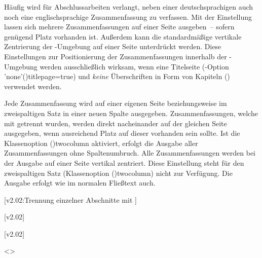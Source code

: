 \begin{DeclareEntity*}{}
\begin{DeclareEntity*}{}
\begin{DeclareEntity*}{}
\begin{Declaration}
Häufig wird für Abschlussarbeiten verlangt, neben einer deutschsprachigen auch 
noch eine englischsprachige Zusammenfassung zu verfassen. Mit der Einstellung 
 lassen sich mehrere Zusammenfassungen auf einer 
Seite ausgeben~-- sofern genügend Platz vorhanden ist. Außerdem kann 
die standardmäßige vertikale Zentrierung der -Umgebung 
auf einer Seite unterdrückt werden. Diese Einstellungen zur Positionierung der 
Zusammenfassungen innerhalb der -Umgebung werden 
ausschließlich wirksam, wenn eine Titelseite 
(\KOMAScript-Option \Option'none'(){titlepage=true}) und 
\emph{keine} Überschriften in Form von Kapiteln () 
verwendet werden.
%
\begin{DeclareValues}{}
  Jede Zusammenfassung wird auf einer eigenen Seite
  beziehungsweise im zweispaltigen Satz in einer neuen Spalte ausgegeben.
  Zusammenfassungen, welche mit  getrennt wurden, werden 
  direkt nacheinander auf der gleichen Seite ausgegeben, wenn ausreichend Platz 
  auf dieser vorhanden sein sollte. Ist die Klassenoption 
  \Option(){twocolumn} aktiviert, erfolgt die Ausgabe 
  aller Zusammenfassungen ohne Spaltenumbruch.
  Alle Zusammenfassungen werden bei der Ausgabe auf einer Seite vertikal 
  zentriert. Diese Einstellung steht für den zweispaltigen Satz
  (Klassenoption \Option(){twocolumn}) nicht zur Verfügung.
  Die Ausgabe erfolgt wie im normalen Fließtext auch.
\end{DeclareValues}
\end{Declaration}

\begin{Declaration}
  {}
  [v2.02:Trennung einzelner Abschnitte mit ]
\begin{Declaration}
  {}
\begin{Declaration}
  {}
\begin{Declaration}
  {}
  [v2.02]
\begin{Declaration}
  {}
  [v2.02]
\begin{Declaration}
  {}
\begin{Declaration}
  {}
  <>
\printdeclarationlist


\end{Declaration}
\end{Declaration}
\end{Declaration}
\end{Declaration}
\end{Declaration}
\end{Declaration}
\end{Declaration}
\end{DeclareEntity*}
\end{DeclareEntity*}
\end{DeclareEntity*}
